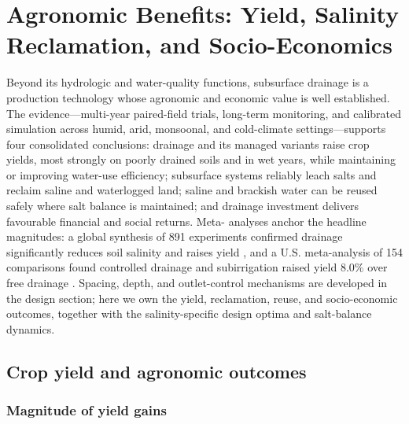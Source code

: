 \documentclass[11pt]{article}
\begin{document}
\section*{Agronomic Benefits: Yield, Salinity Reclamation, and Socio-Economics}

Beyond its hydrologic and water-quality functions, subsurface drainage is a
production technology whose agronomic and economic value is well established.
The evidence---multi-year paired-field trials, long-term monitoring, and
calibrated simulation across humid, arid, monsoonal, and cold-climate
settings---supports four consolidated conclusions: drainage and its managed
variants raise crop yields, most strongly on poorly drained soils and in wet
years, while maintaining or improving water-use efficiency; subsurface systems
reliably leach salts and reclaim saline and waterlogged land; saline and
brackish water can be reused safely where salt balance is maintained; and
drainage investment delivers favourable financial and social returns. Meta-
analyses anchor the headline magnitudes: a global synthesis of 891 experiments
confirmed drainage significantly reduces soil salinity and raises yield
\parencite{Yang2025}, and a U.S. meta-analysis of 154 comparisons found
controlled drainage and subirrigation raised yield $8.0\%$ over free drainage
\parencite{Singh2022b}. Spacing, depth, and outlet-control mechanisms are
developed in the design section; here we own the yield, reclamation, reuse, and
socio-economic outcomes, together with the salinity-specific design optima and
salt-balance dynamics.

\subsection{Crop yield and agronomic outcomes}

\subsubsection{Magnitude of yield gains}
\end{document}
